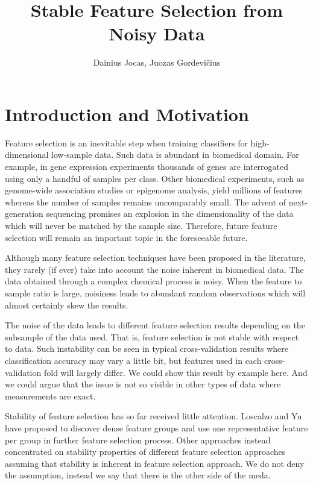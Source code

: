 \documentclass{llncs}
\title{Stable Feature Selection from Noisy Data}
\author{Dainius Jocas, Juozas Gordevi\v cius}
\institute{%
Vilnius University, Institute of Mathematics and Informatics%
}
\begin{document}
	\maketitle
	



\section{Introduction and Motivation}

Feature selection is an inevitable step when training classifiers for
high-dimensional low-sample data. Such data is abundant in biomedical domain.
For example, in gene expression experiments thousands of genes are
interrogated using only a handful of samples per class. Other biomedical
experiments, such as genome-wide association studies or epigenome analysis,
yield millions of features whereas the number of samples remains uncomparably
small. The advent of next-generation sequencing promises an explosion in the
dimensionality of the data which will never be matched by the sample size.
Therefore, future feature selection will remain an important topic in the
foreseeable future.

Although many feature selection techniques have been proposed in the
literature, they rarely (if ever) take into account the noise inherent in
biomedical data. The data obtained through a complex chemical process is
noisy. When the feature to sample ratio is large, noisiness leads to abundant
random observations which will almost certainly skew the results.

The noise of the data leads to different feature selection results depending
on the subsample of the data used. That is, feature selection is not stable
with respect to data. Such instability can be seen in typical cross-validation
results where classification accuracy may vary a little bit, but features used
in each cross-validation fold will largely differ. We could show this result
by example here. And we could argue that the issue is not so visible in other
types of data where measurements are exact.

Stability of feature selection has so far received little attention. Loscalzo
and Yu have proposed to discover dense feature groups and use one
representative feature per group in further feature selection process. Other
approaches instead concentrated on stability properties of different feature
selection approaches assuming that stability is inherent in feature selection
approach. We do not deny the assumption, instead we say that there is the
other side of the meda.
\end{document}
